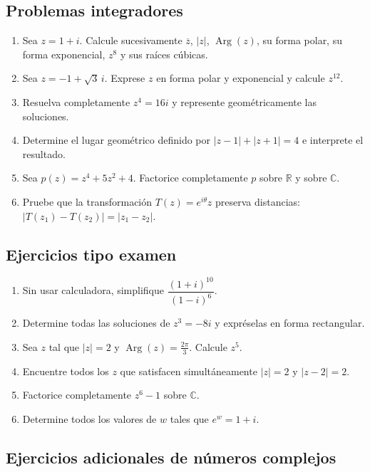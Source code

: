 \subsection{Problemas integradores}
\begin{enumerate}
\item Sea $z=1+i$. Calcule sucesivamente $\overline z$, $|z|$, $\operatorname{Arg}(z)$, su forma polar, su forma exponencial, $z^8$ y sus raíces cúbicas.
\item Sea $z=-1+\sqrt3\,i$. Exprese $z$ en forma polar y exponencial y calcule $z^{12}$.
\item Resuelva completamente $z^4=16i$ y represente geométricamente las soluciones.
\item Determine el lugar geométrico definido por $|z-1|+|z+1|=4$ e interprete el resultado.
\item Sea $p(z)=z^4+5z^2+4$. Factorice completamente $p$ sobre $\mathbb{R}$ y sobre $\mathbb{C}$.
\item Pruebe que la transformación $T(z)=e^{i\theta}z$ preserva distancias: $|T(z_1)-T(z_2)|=|z_1-z_2|$.
\end{enumerate}

\subsection{Ejercicios tipo examen}
\begin{enumerate}
\item Sin usar calculadora, simplifique $\dfrac{(1+i)^{10}}{(1-i)^6}$.
\item Determine todas las soluciones de $z^3=-8i$ y expréselas en forma rectangular.
\item Sea $z$ tal que $|z|=2$ y $\operatorname{Arg}(z)=\frac{2\pi}{3}$. Calcule $z^5$.
\item Encuentre todos los $z$ que satisfacen simultáneamente $|z|=2$ y $|z-2|=2$.
\item Factorice completamente $z^6-1$ sobre $\mathbb{C}$.
\item Determine todos los valores de $w$ tales que $e^w=1+i$.
\end{enumerate}

\subsection*{Ejercicios adicionales de números complejos}

